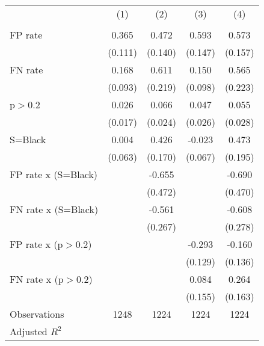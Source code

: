 \begin{tabular}{l*{4}{c}}
\hline\hline
                &\multicolumn{1}{c}{(1)}&\multicolumn{1}{c}{(2)}&\multicolumn{1}{c}{(3)}&\multicolumn{1}{c}{(4)}\\
                &\multicolumn{1}{c}{}&\multicolumn{1}{c}{}&\multicolumn{1}{c}{}&\multicolumn{1}{c}{}\\
\hline
FP rate         &    0.365&    0.472&    0.593&    0.573\\
                &  (0.111)&  (0.140)&  (0.147)&  (0.157)\\
FN rate         &    0.168&    0.611&    0.150&    0.565\\
                &  (0.093)&  (0.219)&  (0.098)&  (0.223)\\
p$>$0.2         &    0.026&    0.066&    0.047&    0.055\\
                &  (0.017)&  (0.024)&  (0.026)&  (0.028)\\
S=Black         &    0.004&    0.426&   -0.023&    0.473\\
                &  (0.063)&  (0.170)&  (0.067)&  (0.195)\\
FP rate x (S=Black)&         &   -0.655&         &   -0.690\\
                &         &  (0.472)&         &  (0.470)\\
FN rate x (S=Black)&         &   -0.561&         &   -0.608\\
                &         &  (0.267)&         &  (0.278)\\
FP rate x (p$>$0.2)&         &         &   -0.293&   -0.160\\
                &         &         &  (0.129)&  (0.136)\\
FN rate x (p$>$0.2)&         &         &    0.084&    0.264\\
                &         &         &  (0.155)&  (0.163)\\
\hline
Observations    &     1248&     1224&     1224&     1224\\
Adjusted \(R^{2}\)&         &         &         &         \\
\hline\hline

\end{tabular}
